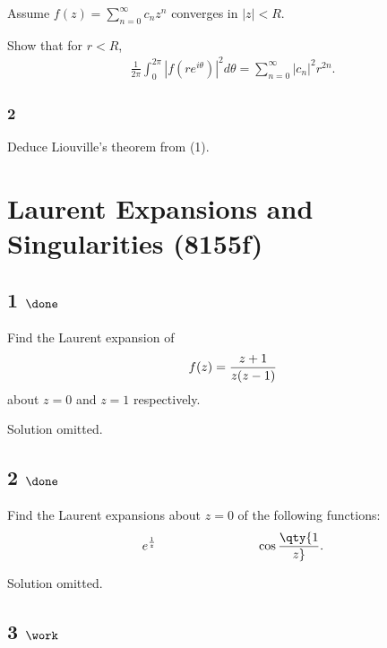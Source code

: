 Assume \(\displaystyle f(z) = \sum_{n=0}^\infty c_n z^n\) converges in
\(|z| < R\).

Show that for \(r <R\),
\begin{align*}
\frac{1}{2 \pi} \int_0^{2 \pi} |f(r e^{i \theta})|^2 d \theta = \sum_{n=0}^\infty |c_n|^2 r^{2n}
.\end{align*}

\hypertarget{section-8}{%
\subsubsection{2}\label{section-8}}

Deduce Liouville's theorem from (1).

\hypertarget{laurent-expansions-and-singularities-8155f}{%
\section{Laurent Expansions and Singularities
(8155f)}\label{laurent-expansions-and-singularities-8155f}}

\hypertarget{done-6}{%
\subsection{\texorpdfstring{1
\(\done\)}{1 \textbackslash done}}\label{done-6}}

Find the Laurent expansion of
\begin{align*}
f(z) = {z + 1 \over z(z-1)}
\end{align*}
about \(z=0\) and \(z=1\) respectively.

Solution omitted.

\hypertarget{done-7}{%
\subsection{\texorpdfstring{2
\(\done\)}{2 \textbackslash done}}\label{done-7}}

Find the Laurent expansions about \(z=0\) of the following functions:
\begin{align*}
e^{1\over z} \hspace{8em} \cos \qty{1\over z}
.\end{align*}

Solution omitted.

\hypertarget{work-30}{%
\subsection{\texorpdfstring{3
\(\work\)}{3 \textbackslash work}}\label{work-30}}

